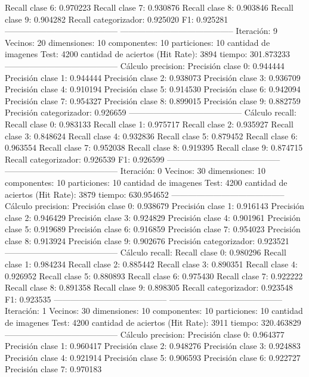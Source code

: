 Recall clase 6: 0.970223
Recall clase 7: 0.930876
Recall clase 8: 0.903846
Recall clase 9: 0.904282
Recall categorizador: 0.925020
F1: 0.925281
-----------------------------------------
-----------------------------------------
Iteración: 9
Vecinos: 20
dimensiones: 10
componentes: 10
particiones: 10
cantidad de imagenes Test: 4200
cantidad de aciertos (Hit Rate): 3894
tiempo: 301.873233
-----------------------------------------
Cálculo precision: 
Precisión clase 0: 0.944444
Precisión clase 1: 0.944444
Precisión clase 2: 0.938073
Precisión clase 3: 0.936709
Precisión clase 4: 0.910194
Precisión clase 5: 0.914530
Precisión clase 6: 0.942094
Precisión clase 7: 0.954327
Precisión clase 8: 0.899015
Precisión clase 9: 0.882759
Precisión categorizador: 0.926659
-----------------------------------------
Cálculo recall: 
Recall clase 0: 0.983133
Recall clase 1: 0.975717
Recall clase 2: 0.935927
Recall clase 3: 0.848624
Recall clase 4: 0.932836
Recall clase 5: 0.879452
Recall clase 6: 0.963554
Recall clase 7: 0.952038
Recall clase 8: 0.919395
Recall clase 9: 0.874715
Recall categorizador: 0.926539
F1: 0.926599
-----------------------------------------
-----------------------------------------
Iteración: 0
Vecinos: 30
dimensiones: 10
componentes: 10
particiones: 10
cantidad de imagenes Test: 4200
cantidad de aciertos (Hit Rate): 3879
tiempo: 630.954652
-----------------------------------------
Cálculo precision: 
Precisión clase 0: 0.938679
Precisión clase 1: 0.916143
Precisión clase 2: 0.946429
Precisión clase 3: 0.924829
Precisión clase 4: 0.901961
Precisión clase 5: 0.919689
Precisión clase 6: 0.916859
Precisión clase 7: 0.954023
Precisión clase 8: 0.913924
Precisión clase 9: 0.902676
Precisión categorizador: 0.923521
-----------------------------------------
Cálculo recall: 
Recall clase 0: 0.980296
Recall clase 1: 0.984234
Recall clase 2: 0.885442
Recall clase 3: 0.890351
Recall clase 4: 0.926952
Recall clase 5: 0.880893
Recall clase 6: 0.975430
Recall clase 7: 0.922222
Recall clase 8: 0.891358
Recall clase 9: 0.898305
Recall categorizador: 0.923548
F1: 0.923535
-----------------------------------------
-----------------------------------------
Iteración: 1
Vecinos: 30
dimensiones: 10
componentes: 10
particiones: 10
cantidad de imagenes Test: 4200
cantidad de aciertos (Hit Rate): 3911
tiempo: 320.463829
-----------------------------------------
Cálculo precision: 
Precisión clase 0: 0.964377
Precisión clase 1: 0.960417
Precisión clase 2: 0.948276
Precisión clase 3: 0.924883
Precisión clase 4: 0.921914
Precisión clase 5: 0.906593
Precisión clase 6: 0.922727
Precisión clase 7: 0.970183
